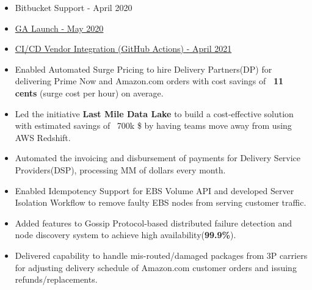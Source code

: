 \documentclass[10pt]{article}
\begin{document}
\begin{minipage}[t]{0.55\textwidth}
\begin{flushright}
\begin{itemize}
\item Bitbucket Support - April 2020
\item \href{https://aws.amazon.com/blogs/aws/find-your-most-expensive-lines-of-code-amazon-codeguru-is-now-generally-available/}{GA Launch - May 2020}
\item \href{https://aws.amazon.com/blogs/aws/amazon_codeguru_reviewer_updates_new_java_detectors_and_cicd_integration_with_github_actions/}{CI/CD Vendor Integration (GitHub Actions) - April 2021}
\end{itemize}
\begin{itemize}
\item Enabled Automated Surge Pricing to hire Delivery Partners(DP) for delivering Prime Now and Amazon.com orders with cost savings of {\bf ~11 cents} (surge cost per hour) on average.
\item Led the initiative {\bf Last Mile Data Lake} to build a cost-effective solution with estimated savings of ~700k \$ by having teams move away from using AWS Redshift.
\item Automated the invoicing and disbursement of payments for Delivery Service Providers(DSP), processing MM of dollars every month.
\end{itemize}

\begin{itemize}
\item Enabled Idempotency Support for EBS Volume API and developed Server Isolation Workflow to remove faulty EBS nodes from serving customer traffic.
\item Added features to Gossip Protocol-based distributed failure detection and node discovery system to achieve high availability({\bf 99.9\%}).
\end{itemize}
\begin{itemize}
\item Delivered capability to handle mis-routed/damaged packages from 3P carriers for adjusting delivery schedule of Amazon.com customer orders and issuing refunds/replacements. 
\end{itemize}
\end{flushright}


\end{minipage}
\end{document}
